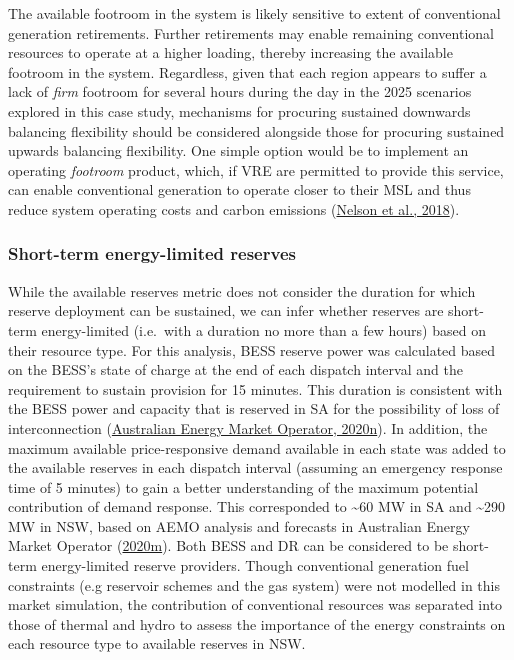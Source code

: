 \documentclass[12pt,a4paper,]{report}
\begin{document}
The available footroom in the system is likely sensitive to extent of
conventional generation retirements. Further retirements may enable
remaining conventional resources to operate at a higher loading, thereby
increasing the available footroom in the system. Regardless, given that
each region appears to suffer a lack of \emph{firm} footroom for several
hours during the day in the 2025 scenarios explored in this case study,
mechanisms for procuring sustained downwards balancing flexibility
should be considered alongside those for procuring sustained upwards
balancing flexibility. One simple option would be to implement an
operating \emph{footroom} product, which, if VRE are permitted to
provide this service, can enable conventional generation to operate
closer to their MSL and thus reduce system operating costs and carbon
emissions
(\protect\hyperlink{ref-nelsonInvestigatingEconomicValue2018}{Nelson et
al., 2018}).

\hypertarget{sec:reserves-stelr}{%
\subsubsection{Short-term energy-limited
reserves}\label{sec:reserves-stelr}}

While the available reserves metric does not consider the duration for
which reserve deployment can be sustained, we can infer whether reserves
are short-term energy-limited (i.e.~with a duration no more than a few
hours) based on their resource type. For this analysis, BESS reserve
power was calculated based on the BESS's state of charge at the end of
each dispatch interval and the requirement to sustain provision for 15
minutes. This duration is consistent with the BESS power and capacity
that is reserved in SA for the possibility of loss of interconnection
(\protect\hyperlink{ref-australianenergymarketoperator2020SystemStrength2020}{Australian
Energy Market Operator, 2020n}). In addition, the maximum available
price-responsive demand available in each state was added to the
available reserves in each dispatch interval (assuming an emergency
response time of 5 minutes) to gain a better understanding of the
maximum potential contribution of demand response. This corresponded to
\textasciitilde60 MW in SA and \textasciitilde290 MW in NSW, based on
AEMO analysis and forecasts in Australian Energy Market Operator
(\protect\hyperlink{ref-australianenergymarketoperator2020InputsAssumptions2020}{2020m}).
Both BESS and DR can be considered to be short-term energy-limited
reserve providers. Though conventional generation fuel constraints (e.g
reservoir schemes and the gas system) were not modelled in this market
simulation, the contribution of conventional resources was separated
into those of thermal and hydro to assess the importance of the energy
constraints on each resource type to available reserves in NSW.
\end{document}
